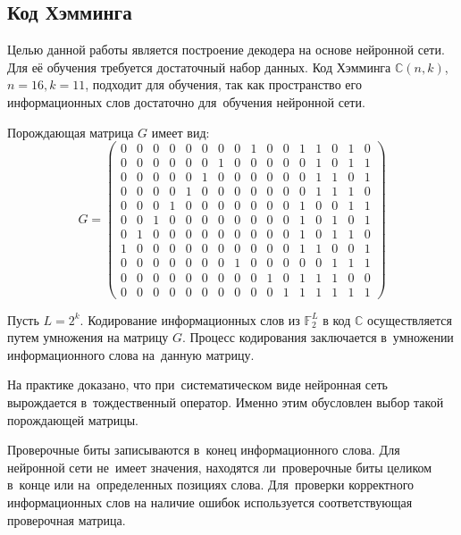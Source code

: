 \subsection{Код Хэмминга}

Целью данной работы является построение декодера на основе нейронной сети. Для её обучения требуется достаточный набор данных. Код Хэмминга $\mathbb{C}(n,k)$, $n = 16, k = 11$, подходит для обучения, так как пространство его информационных слов достаточно для~обучения нейронной сети.

Порождающая матрица $G$ имеет вид:
\begin{equation}
G =
\begin{pmatrix}
0 & 0 & 0 & 0 & 0 & 0 & 0 & 0 & 1 & 0 & 0 & 1 & 1 & 0 & 1 & 0 \\
0 & 0 & 0 & 0 & 0 & 0 & 1 & 0 & 0 & 0 & 0 & 0 & 1 & 0 & 1 & 1 \\
0 & 0 & 0 & 0 & 0 & 1 & 0 & 0 & 0 & 0 & 0 & 0 & 1 & 1 & 0 & 1 \\
0 & 0 & 0 & 0 & 1 & 0 & 0 & 0 & 0 & 0 & 0 & 0 & 1 & 1 & 1 & 0 \\
0 & 0 & 0 & 1 & 0 & 0 & 0 & 0 & 0 & 0 & 0 & 1 & 0 & 0 & 1 & 1 \\
0 & 0 & 1 & 0 & 0 & 0 & 0 & 0 & 0 & 0 & 0 & 1 & 0 & 1 & 0 & 1 \\
0 & 1 & 0 & 0 & 0 & 0 & 0 & 0 & 0 & 0 & 0 & 1 & 0 & 1 & 1 & 0 \\
1 & 0 & 0 & 0 & 0 & 0 & 0 & 0 & 0 & 0 & 0 & 1 & 1 & 0 & 0 & 1 \\
0 & 0 & 0 & 0 & 0 & 0 & 0 & 1 & 0 & 0 & 0 & 0 & 0 & 1 & 1 & 1 \\
0 & 0 & 0 & 0 & 0 & 0 & 0 & 0 & 0 & 1 & 0 & 1 & 1 & 1 & 0 & 0 \\
0 & 0 & 0 & 0 & 0 & 0 & 0 & 0 & 0 & 0 & 1 & 1 & 1 & 1 & 1 & 1
\end{pmatrix}
\end{equation}

Пусть $L = 2^k$. Кодирование информационных слов из $\mathbb{F}_2^L$ в код $\mathbb{C}$ осуществляется путем умножения на матрицу $G$.
Процесс кодирования заключается в~умножении информационного слова на~данную матрицу.

На практике доказано, что при~систематическом виде нейронная сеть вырождается в~тождественный оператор. Именно этим обусловлен выбор такой порождающей матрицы.

Проверочные биты записываются в~конец информационного слова. Для нейронной сети не~имеет значения, находятся ли~проверочные биты целиком в~конце или на~определенных позициях слова.
Для~проверки корректного информационных слов на наличие ошибок используется соответствующая проверочная матрица.

